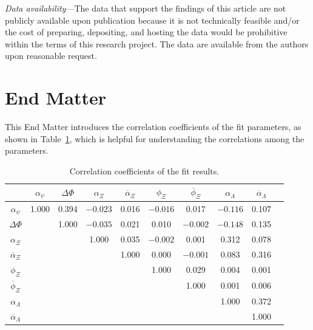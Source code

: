 \documentclass[aps,amsmath,amssymb,reprint]{revtex4-2}
\begin{document}
\textit{Data availability}—The data that support the findings of this article are not publicly available upon publication
because  it is not technically feasible and/or the cost of preparing, depositing,  and hosting the data would  be prohibitive
within  the terms  of this research project. The data are available from the authors upon reasonable request.







\section*{End Matter}
This End Matter introduces the correlation coefficients of the fit parameters, as shown in Table~\ref{table:maincorrelations}, which is helpful for understanding the correlations among the parameters.

\begin{table}[htbp]

\caption{Correlation coefficients of the fit results.}
\label{table:maincorrelations}

\begin{tabular}{|c|c| c | c | c | c | c | c | c | c |}
\hline\hline
                            & $\alpha_{\psi}$ & $\Delta\Phi$ & $\alpha_{\Xi}$ & $\overline\alpha_{\Xi}$ & $\phi_\Xi$ & $\overline{\phi}_\Xi$ & $\alpha_{\Lambda}$ & $\overline\alpha_{\Lambda}$ \\  \hline
$\alpha_{\psi}$             & 1.000      & 0.394 & $-0.023$  & 0.016      & $-0.016$     & 0.017      & $-0.116$        & 0.107         \\
$\Delta\Phi$                &            & 1.000 & $-0.035$  & 0.021      & 0.010      & $-0.002$     & $-0.148$        & 0.135         \\
$\alpha_{\Xi}$              &            &       & 1.000   & 0.035      & $-0.002$     & 0.001      & 0.312         & 0.078         \\
$\overline\alpha_{\Xi}$     &            &       &         & 1.000      & 0.000      & $-0.001$     & 0.083         & 0.316         \\
$\phi_\Xi$                  &            &       &         &            & 1.000      & 0.029      & 0.004         & 0.001         \\
$\overline{\phi}_\Xi$       &            &       &         &            &            & 1.000      & 0.001         & 0.006         \\
$\alpha_{\Lambda}$          &            &       &         &            &            &            & 1.000         & 0.372         \\
$\overline\alpha_{\Lambda}$ &            &       &         &            &            &            &               & 1.000         \\
\hline\hline
\end{tabular}

\end{table}
\end{document}
